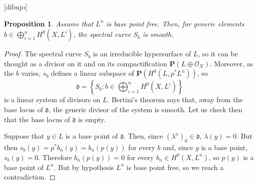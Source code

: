 \documentclass[12pt,a4paper]{book}
\newtheorem{prop}[thm]{Proposition}
\theoremstyle{definition} \newtheorem{defn}[thm]{Definition}
\theoremstyle{definition} \newtheorem{ejemplo}[thm]{Example}
\theoremstyle{remark} \newtheorem{rem}[thm]{Remark}
\def\OO{\mathscr{O}}
\def\PP{\mathbf{P}}
\begin{document}
       [dibujo]

       \begin{prop}
	 Assume that $L^n$ is base point free. Then, for generic elements $b\in \bigoplus_{i=1}^n H^0(X,L^i)$, the spectral curve $S_b$ is smooth.
       \end{prop}

       \begin{proof}
	 The spectral curve $S_b$ is an irreducible hypersurface of $L$, so it can be thought as a divisor on it and on its compactification $\PP(L\oplus \OO_X)$. Moreover, as the $b$ varies, $s_b$ defines a linear subspace of $\PP(H^0(L,p^*L^n))$, so 
	 \begin{equation*}
	   \mathfrak{d}=\left\{ S_b: b\in \bigoplus_{i=1}^n H^0(X,L^i) \right\}
	 \end{equation*}
	 is a linear system of divisors on $L$. Bertini's theorem says that, away from the base locus of $\mathfrak{d}$, the generic divisor of the system is smooth. Let us check then that the base locus of $\mathfrak{d}$ is empty.

	 Suppose that $y \in L$ is a base point of $\mathfrak{d}$. Then, since $(\lambda^n)_0 \in \mathfrak{d}$, $\lambda(y)=0$. But then $s_b(y)=p^*b_n(y)=b_n(p(y))$ for every $b$ and, since $y$ is a base point, $s_b(y)=0$. Therefore $b_n(p(y)) = 0$ for every $b_n \in H^0(X,L^n)$, so $p(y)$ is a base point of $L^n$. But by hypothesis $L^n$ is base point free, so we reach a contradiction.
       \end{proof}
\end{document}
